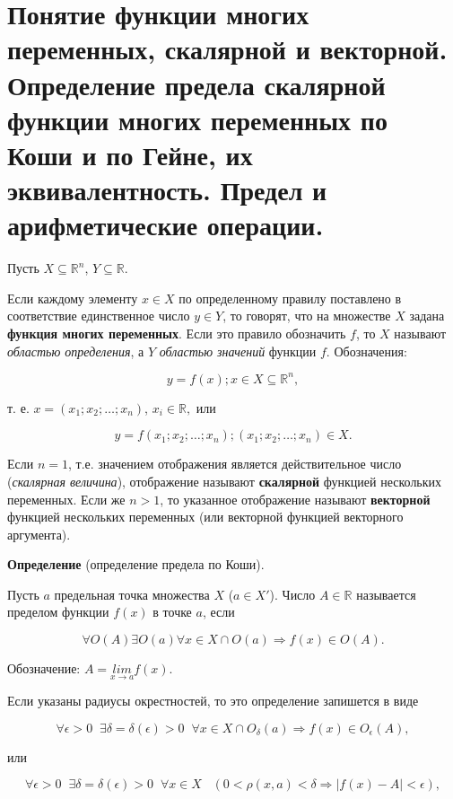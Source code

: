 \section{Понятие функции многих переменных, скалярной и векторной. Определение предела скалярной функции многих переменных по Коши и по Гейне, их эквивалентность. Предел и арифметические операции.}

Пусть $X \subseteq \mathbb{R}^n$, $Y \subseteq \mathbb{R}$.

Если каждому элементу $x \in X$ по определенному правилу поставлено в соответствие единственное число $y \in Y$,
то говорят, что на множестве $X$ задана \textbf{функция многих
переменных}. Если это правило обозначить $f$, то $X$ называют \textit{областью определения}, 
а $Y$  \textit{областью значений} функции $f$. Обозначения:

$$y=f(x); x \in X \subseteq \mathbb{R}^n,$$

т. е. $x = (x_1; x_2; \ldots ; x_n)$, $x_i \in \mathbb{R},$ или

$$y = f(x_1; x_2; \ldots ; x_n); (x_1; x_2; \ldots ; x_n) \in X.$$

Если $n=1$, т.е. значением отображения является действительное число (\textit{скалярная величина}), отображение называют
\textbf{скалярной} функцией нескольких переменных. Если же $n>1$, то указанное отображение
называют \textbf{векторной} функцией нескольких переменных (или векторной функцией
векторного аргумента).

\;

\textbf{Определение} (определение предела по Коши).

Пусть $a$ предельная точка множества $X$ ($a \in X'$). Число
$A \in \mathbb{R}$ называется пределом функции $f(x)$ в точке $a$, если

$$\forall O(A) \exists O(a) \forall x \in X \cap O (a) \Rightarrow f(x) \in O(A).$$

Обозначение: $A = \underset{x \rightarrow a} {lim} f(x)$.

Если указаны радиусы окрестностей, то это определение запишется в виде

$$\forall \epsilon > 0 \;\; \exists \delta = \delta(\epsilon) > 0 \;\; \forall x \in X \cap O_{\delta}(a) \Rightarrow f(x) \in O_{\epsilon}(A),$$

или

$$\forall \epsilon > 0 \;\; \exists \delta = \delta (\epsilon) > 0 \;\; \forall x \in X \;\;\;
(0 < \rho (x,a) < \delta \Rightarrow \vert f(x) - A \vert < \epsilon),$$

